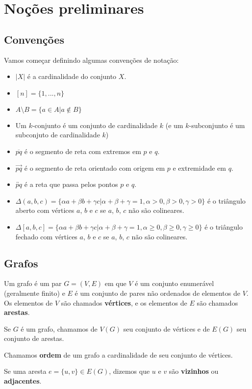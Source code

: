 \chapter{Noções preliminares}
\section{Convenções}
Vamos começar definindo algumas convenções de notação:
\begin{itemize}
    \item $|X|$ é a cardinalidade do conjunto $X$.
    \item $[n]=\{1,...,n\}$
    \item $A\setminus B = \{a\in A|a\notin B\}$
    \item Um $k$-conjunto é um conjunto de cardinalidade $k$ (e um $k$-subconjunto é um subconjuto de cardinalidade $k$)
    \item $\overline{pq}$ é o segmento de reta com extremos em $p$ e $q$.
    \item $\overrightarrow{pq}$ é o segmento de reta orientado com origem em $p$ e extremidade em $q$.
    \item $\overleftrightarrow{pq}$ é a reta que passa pelos pontos $p$ e $q$.
    \item $\Delta(a,b,c)=\{\alpha a+\beta b+\gamma c|\alpha+\beta+\gamma=1, \alpha>0, \beta>0, \gamma>0\}$ é o triângulo aberto com vértices $a$, $b$ e $c$ se $a$, $b$, $c$ não são colineares.
    \item $\Delta[a,b,c]=\{\alpha a+\beta b+\gamma c|\alpha+\beta+\gamma=1, \alpha\geq0, \beta\geq0, \gamma\geq0\}$ é o triângulo fechado com vértices $a$, $b$ e $c$ se $a$, $b$, $c$ não são colineares.
\end{itemize}

\section{Grafos}
Um grafo é um par $G=(V,E)$ em que $V$ é um conjunto enumerável (geralmente finito) e $E$ é um conjunto de pares não ordenados de elementos de $V$. Os elementos de $V$ são chamados \textbf{vértices}, e os elementos de $E$ são chamados \textbf{arestas}.

Se $G$ é um grafo, chamamos de $V(G)$ seu conjunto de vértices e de $E(G)$ seu conjunto de arestas.

Chamamos \textbf{ordem} de um grafo a cardinalidade de seu conjunto de vértices.

Se uma aresta $e=\{u,v\}\in E(G)$, dizemos que $u$ e $v$ são \textbf{vizinhos} ou \textbf{adjacentes}.

